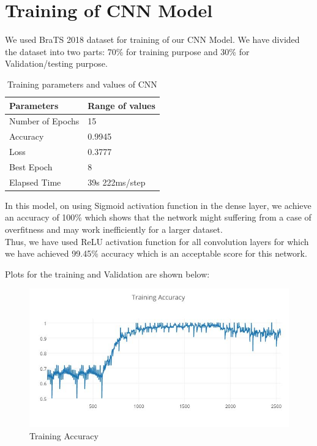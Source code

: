 \section{Training of CNN Model}

We used BraTS 2018 dataset for training of our CNN Model. We have divided the dataset into two parts: 70\% for training purpose and 30\% for Validation/testing purpose.

\begin{table}[h!]
    \centering
    \begin{tabular}{|p{2cm}|p{2cm}|}
         \hline
         \textbf{Parameters} & \textbf{Range of values} \\
         \hline
         Number of Epochs & 15 \\
         \hline
         Accuracy & 0.9945 \\
         \hline
         Loss & 0.3777 \\
         \hline
         Best Epoch & 8 \\
         \hline
         Elapsed Time & 39s 222ms/step \\
         \hline
    \end{tabular}
    \caption{Training parameters and values of CNN}
    \label{tab:my_label}
\end{table}

In this model, on using Sigmoid activation function in the dense layer, we achieve an accuracy of 100\% which shows that the network might suffering from a case of overfitness and may work inefficiently for a larger dataset. \\ Thus, we have used ReLU activation function for all convolution layers for which we have achieved 99.45\% accuracy which is an acceptable score for this network.


Plots for the training and Validation are shown below:

 \begin{figure}[htbp]
	    \centering
		\includegraphics[scale=0.5]{Figures/trainingAccuracy(him).JPG}
	    \caption[Training Accuracy]{Training Accuracy}
	    \label{fig:trainccuracy}
        \end{figure}
        
